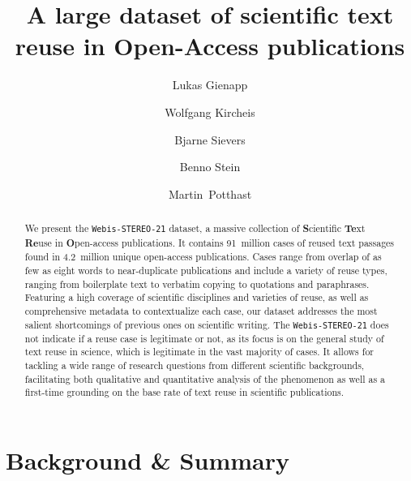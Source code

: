 \documentclass[fleqn,10pt]{wlscirep}
\newcommand{\webisReuseCorpus}{\texttt{Webis-STEREO-21}\xspace}
\begin{document}
\title{A large dataset of scientific text reuse in Open-Access publications}

\author[1,*]{Lukas Gienapp}
\author[1]{Wolfgang Kircheis}
\author[1]{Bjarne Sievers}
\author[2]{Benno Stein}
\author[1,*]{Martin~Potthast}

\begin{abstract}
We present the \webisReuseCorpus dataset, a massive collection of \textbf{S}cientific \textbf{Te}xt \textbf{Re}use in \textbf{O}pen-access publications. It contains 91~million cases of reused text passages found in 4.2~million unique open-access publications. Cases range from overlap of as few as eight words to near-duplicate publications and include a variety of reuse types, ranging from boilerplate text to verbatim copying to quotations and paraphrases. Featuring a high coverage of scientific disciplines and varieties of reuse, as well as comprehensive metadata to contextualize each case, our dataset addresses the most salient shortcomings of previous ones on scientific writing. The \webisReuseCorpus does not indicate if a reuse case is legitimate or not, as its focus is on the general study of text reuse in science, which is legitimate in the vast majority of cases. It allows for tackling a wide range of research questions from different scientific backgrounds, facilitating both qualitative and quantitative analysis of the phenomenon as well as a first-time grounding on the base rate of text reuse in scientific publications.

\end{abstract}

\maketitle

\section*{Background \& Summary}
\end{document}
